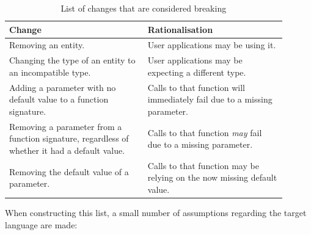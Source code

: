 \documentclass{l4proj}
\begin{document}
\begin{table}[H]
\centering
\caption{List of changes that are considered breaking}
\begin{tabular}{|p{0.45\linewidth}|p{0.45\linewidth}|}
\hline
\textbf{Change}                                                                               & \textbf{Rationalisation}                                                 \\
\hline
Removing an entity.                                                                           & User applications may be using it.                                       \\
\hline
Changing the type of an entity to an incompatible type.                                       & User applications may be expecting a different type.                     \\
\hline
Adding a parameter with no default value to a function signature.                             & Calls to that function will immediately fail due to a missing parameter. \\
\hline
Removing a parameter from a function signature, regardless of whether it had a default value. & Calls to that function \textit{may} fail due to a missing parameter.     \\
\hline
Removing the default value of a parameter.                                                    & Calls to that function may be relying on the now missing default value.  \\
\hline
\end{tabular}
\end{table}

When constructing this list, a small number of assumptions
regarding the target language are made:
\end{document}

